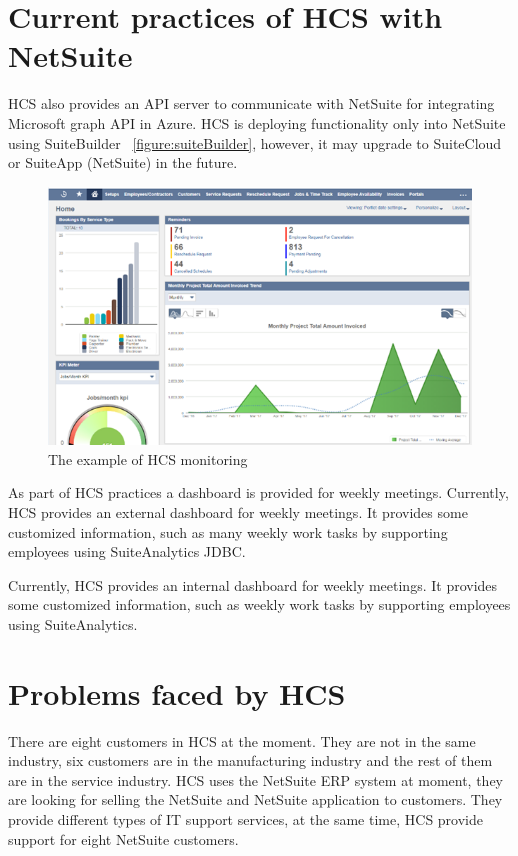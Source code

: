 \section{Current practices of HCS with NetSuite}

HCS also provides an API server to communicate with NetSuite for integrating Microsoft graph API in Azure. HCS is deploying functionality only into NetSuite using SuiteBuilder ~\ref{figure:suiteBuilder}, however, it may upgrade to SuiteCloud or SuiteApp (NetSuite) in the future.

\begin{figure}[!htb]
    \centering 
    \includegraphics[scale=0.7]{resource/HCSNetSuite.png}
    \caption{The example of HCS monitoring}
    \label{figure:hcsMonitor}
\end{figure}


As part of HCS practices a dashboard is provided for weekly meetings.
Currently, HCS provides an external dashboard for weekly meetings. It provides some customized information, such as many weekly work tasks by supporting employees using SuiteAnalytics JDBC.

Currently, HCS provides an internal dashboard for weekly meetings. It provides some customized information, such as weekly work tasks by supporting employees using SuiteAnalytics.






\section{Problems faced by HCS}

There are eight customers in HCS at the moment. They are not in the same industry, six customers are in the manufacturing industry and the rest of them are in the service industry. HCS uses the NetSuite ERP system at moment, they are looking for selling the NetSuite and NetSuite application to customers. They provide different types of IT support services, at the same time, HCS provide support for eight NetSuite customers. 

